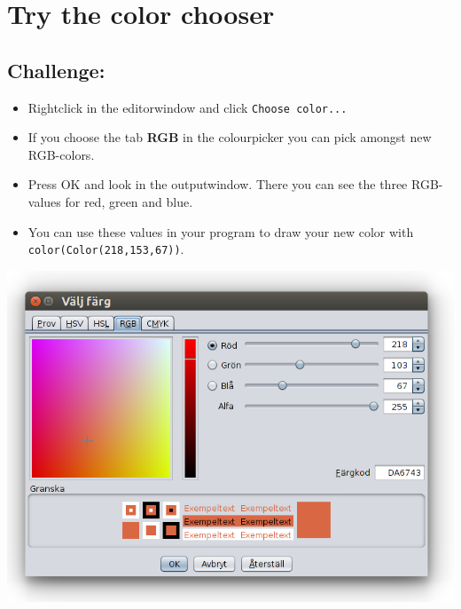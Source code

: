 \chapter{Try the color chooser}
\begin{multicols}{2}
\section*{\color{BrickRed}Challenge:}


\begin{itemize}

\item {Rightclick in the editorwindow and click \lstinline{Choose color...}}
\item {If you choose the tab {\bf RGB} in the colourpicker you can pick amongst new RGB-colors.}
\item {Press OK and look in the outputwindow. There you can see the three RGB-values for red, green and blue.}
\item {You can use these values in your program to draw your new color with \lstinline{color(Color(218,153,67))}.}

\end{itemize}



\columnbreak

\begin{center}
\includegraphics[width=14.0cm]{../img/color-chooser-rgb-sv.png}
\end{center}

\end{multicols}

